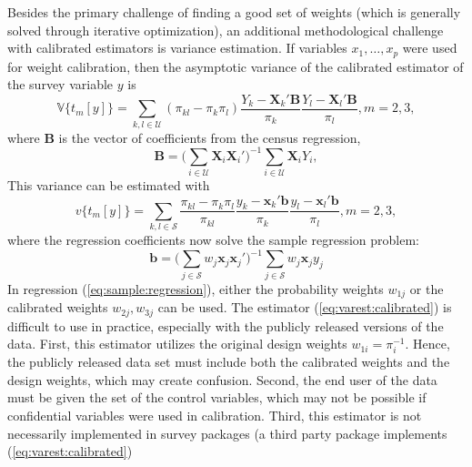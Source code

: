 Besides the primary challenge of finding a good set of weights
(which is generally solved through iterative optimization),
an additional methodological challenge with calibrated estimators
is variance estimation. If variables $x_1,\ldots,x_p$ were used
for weight calibration, then the asymptotic variance of the calibrated
estimator of the survey variable $y$ is
\begin{equation}
    \mathbb{V}\bigl\{t_{m}[y]\bigr\} = \sum_{k,l \in \mathcal{U}}
        (\pi_{kl}-\pi_k \pi_l)
        \frac{Y_k - \mathbf{X}_k ' \mathbf{B}}{\pi_k}
        \frac{Y_l - \mathbf{X}_l ' \mathbf{B}}{\pi_l}, m=2,3,
    \label{eq:var:calibrated}
\end{equation}
where $\mathbf{B}$ is the vector of coefficients from the
census regression,
\begin{equation}
    \mathbf{B}
    = \bigl( \sum_{i \in \mathcal{U}} \mathbf{X}_i \mathbf{X}_i' )^{-1}
      \sum_{i \in \mathcal{U}} \mathbf{X}_i Y_i
    \label{eq:census:regression},
\end{equation}
This variance can be estimated with
\begin{equation}
    v\bigl\{t_{m}[y]\bigr\} = \sum_{k,l \in \mathcal{S}}
        \frac{\pi_{kl}-\pi_k \pi_l}{\pi_{kl}}
        \frac{y_k - \mathbf{x}_k ' \mathbf{b}}{\pi_k}
        \frac{y_l - \mathbf{x}_l ' \mathbf{b}}{\pi_l}, m=2,3,
    \label{eq:varest:calibrated}
\end{equation}
where the regression coefficients now solve the sample
regression problem:
\begin{equation}
    \mathbf{b}
    = \bigl( \sum_{j \in \mathcal{S}} w_j \mathbf{x}_j \mathbf{x}_j' )^{-1}
      \sum_{j \in \mathcal{S}} w_j \mathbf{x}_j y_j
    \label{eq:sample:regression}
\end{equation}
In regression (\ref{eq:sample:regression}),
either the probability weights $w_{1j}$ or the calibrated weights
$w_{2j}, w_{3j}$ can be used. The estimator (\ref{eq:varest:calibrated})
is difficult to use in practice, especially with the publicly released
versions of the data. First, this estimator utilizes the original design weights
$w_{1i}=\pi_i^{-1}$. Hence, the publicly released data set must include
both the calibrated weights and the design weights, which may create
confusion. Second, the end user
of the data must be given the set of the control variables, which may
not be possible if confidential variables were used in calibration. Third,
this estimator is not necessarily implemented in survey packages
(a third party package  implements (\ref{eq:varest:calibrated})
